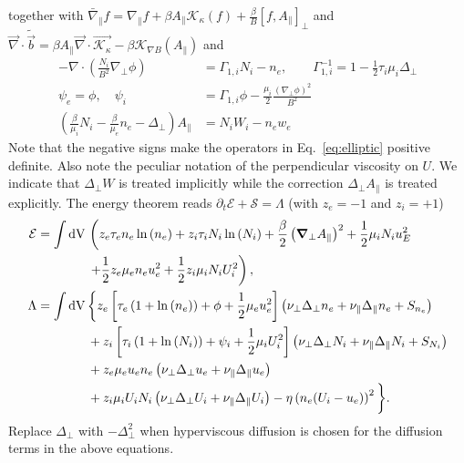 together with
$\bar\nabla_\parallel f = \nabla_\parallel f + \beta A_\parallel \mathcal K_\kappa(f) + \frac{\beta}{B}[ f, A_\parallel]_\perp$
and $\vec \nabla \cdot \tilde{ \vec b} = \beta A_\parallel \vec \nabla\cdot\vec{ \mathcal{ K_\kappa}} - \beta \mathcal K_{\nabla B}(A_\parallel) $
and
\begin{subequations} \label{eq:elliptic}
  \begin{align}
    -\nabla\cdot\left( \frac{N_i}{B^2}\nabla_\perp \phi \right) &= \Gamma_{1,i} N_i - n_e, \quad\quad
    \Gamma_{1,i}^{-1} = 1-\frac{1}{2}\tau_i\mu_i \Delta_\perp \\
    \psi_e = \phi, \quad \psi_i &= \Gamma_{1,i}\phi -\frac{\mu_i}{2}\frac{(\nabla_\perp\phi)^2}{B^2} \\
    \left(\frac{\beta}{\mu_i}N_i - \frac{\beta}{\mu_e}n_e-\Delta_\perp\right)
    A_\parallel &= N_iW_i-n_e w_e
  \end{align}
\end{subequations}
Note that the negative signs make the operators in Eq.~\eqref{eq:elliptic} positive definite. Also note the peculiar notation of the perpendicular viscosity on $U$.
We indicate that $\Delta_\perp W$ is treated implicitly while the correction $\Delta_\perp A_\parallel$ is treated explicitly.
The energy theorem reads $\partial_t \mathcal E + \mathcal S = \Lambda$ (with $z_e=-1$ and $z_i=+1$)
\begin{align}
  \mathcal{E}= \int  \dV & \left( z_e\tau_e n_e \ln{(n_e)} +z_i\tau_i N_i\ln{(N_i)}
  +\frac{\beta}{2}\left(\vec \nabla_\perp A_\parallel\right)^2
   +  \frac{1}{2} \mu_i N_i u_E^2  \right .\nonumber\\
   &\left. +\frac{1}{2} z_e\mu_e  n_e u_e^2
  +\frac{1}{2} z_i\mu_i  N_i U_i^2  \right),\\
  \Lambda =  \int \dV & \bigg\{  z_e\left[\tau_e\left( 1+\ln{(n_e)}\right) + \phi + \frac{1}{2} \mu_e u_e^2 \right]
    \left(\nu_\perp\Delta_\perp n_e + \nu_\parallel\Delta_\parallel n_e + S_{n_e}\right)
  \nonumber\\ &
+z_i\left[\tau_i\left( 1+\ln{(N_i)}\right) + \psi_i + \frac{1}{2} \mu_i U_i^2 \right]
    \left(\nu_\perp\Delta_\perp N_i + \nu_\parallel\Delta_\parallel N_i +S_{N_i}\right)
\nonumber \\ &
    +z_e\mu_e u_e n_e \left(\nu_\perp\Delta_\perp u_e + \nu_\parallel \Delta_\parallel u_e\right)\nonumber \\ &
    +z_i\mu_iU_i N_i \left(\nu_\perp\Delta_\perp U_i + \nu_\parallel \Delta_\parallel U_i\right)%
    - \eta \left(n_e(U_i-u_e)\right)^2\bigg\}.
\end{align}
Replace $\Delta_\perp$ with $-\Delta_\perp^2$ when hyperviscous diffusion is chosen
for the diffusion terms in the above equations.
